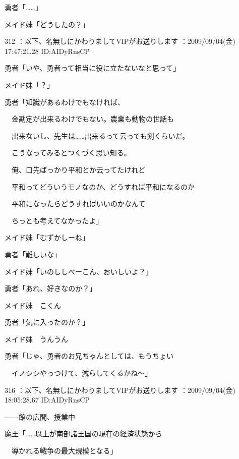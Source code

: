 \documentclass[a4j,twocolumn]{tarticle}
\begin{document}
勇者「……」 



メイド妹「どうしたの？」 

	
    
    

312 ：以下、名無しにかわりましてVIPがお送りします ：2009/09/04(金) 17:47:21.28 ID:AIDyRnsCP 


勇者「いや、勇者って相当に役に立たないなと思って」\par{} 
メイド妹「？」 



勇者「知識があるわけでもなければ、\par{} 
　金勘定が出来るわけでもない。農業も動物の世話も\par{} 
　出来ないし、先生は……出来るって云っても剣くらいだ。\par{} 
　こうなってみるとつくづく思い知る。\par{} 
　俺、口先ばっかり平和とか云ってたけれど\par{} 
　平和ってどういうモノなのか、どうすれば平和になるのか\par{} 
　平和になったらどうすればいいのかなんて\par{} 
　ちっとも考えてなかったよ」 



メイド妹「むずかしーね」\par{} 
勇者「難しいな」 



メイド妹「いのししべーこん、おいしいよ？」 



勇者「あれ、好きなのか？」\par{} 
メイド妹　こくん 



勇者「気に入ったのか？」\par{} 
メイド妹　うんうん 



勇者「じゃ、勇者のお兄ちゃんとしては、もうちょい\par{} 
　イノシシやっつけて、減らしてくるかね～」 

	
    
    

316 ：以下、名無しにかわりましてVIPがお送りします ：2009/09/04(金) 18:05:28.67 ID:AIDyRnsCP 


――館の広間、授業中 



魔王「……以上が南部諸王国の現在の経済状態から\par{} 
　導かれる戦争の最大規模となる」 
\end{document}
